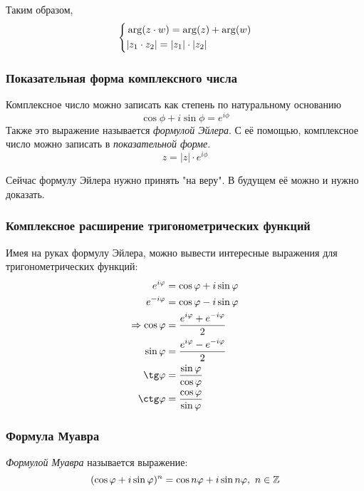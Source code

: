 Таким образом,
$$
    \left\{\begin{aligned}
    &\arg(z \cdot w) = \arg(z) + \arg(w)
    \\
    &|z_1 \cdot z_2| = |z_1| \cdot |z_2|
    \end{aligned}\right.
$$

\subsubsection*{Показательная форма комплексного числа}

\begin{definition}
    Комплексное число можно записать как степень по натуральному основанию
    $$
        \cos \phi + i \sin \phi = e^{i \phi}
    $$
    Также это выражение называется \textit{формулой Эйлера}. С её помощью, комплексное число можно записать в \textit{показательной форме}.
    $$
        z = |z| \cdot e^{i \phi}
    $$
\end{definition}

\begin{note}
    Сейчас формулу Эйлера нужно принять "на веру". В будущем её можно и нужно доказать.
\end{note}

\subsubsection*{Комплексное расширение тригонометрических функций}

Имея на руках формулу Эйлера, можно вывести интересные выражения для тригонометрических функций:
\begin{align*}
    e^{i\phi} &= \cos\phi + i \sin\phi
    \\
    e^{-i\phi} &= \cos\phi - i \sin\phi
    \\
    \Ra \cos\phi &= \frac{\dse e^{i\phi} + e^{-i\phi}}{2}
    \\
    \sin\phi &= \frac{\dse e^{i\phi} - e^{-i\phi}}{2}
    \\
    \tg\phi &= \frac{\sin\phi}{\cos\phi}
    \\
    \ctg\phi &= \frac{\cos\phi}{\sin\phi}
\end{align*}

\subsubsection*{Формула Муавра}

\begin{definition}
    \textit{Формулой Муавра} называется выражение:
    $$
        (\cos \varphi + i \sin \varphi)^n = \cos n\varphi + i \sin n\varphi,\ n \in \mathbb{Z}
    $$
\end{definition}

